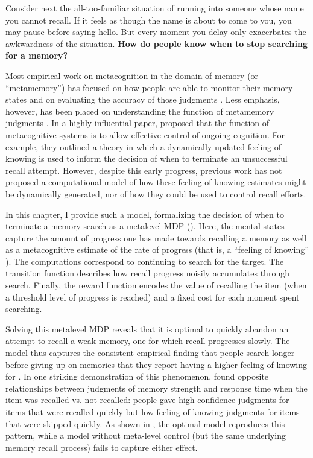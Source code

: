 \documentclass[dsingle]{memo}
\begin{document}
Consider next the all-too-familiar situation of running into someone whose name you cannot recall. If it feels as though the name is about to come to you, you may pause before saying hello. But every moment you delay only exacerbates the awkwardness of the situation. \textbf{How do people know when to stop searching for a memory?}

Most empirical work on metacognition in the domain of memory (or ``metamemory'') has focused on how people are able to monitor their memory states \citep{reder1992determines,eakin2005illusions} and on evaluating the accuracy of those judgments \citep{hart1965memory,vesonder1985ability,dunlosky2007metacomprehension}. Less emphasis, however, has been placed on understanding the function of metamemory judgments \citep{schwartz2017metamemory}. In a highly influential paper, \citet{nelson1990metamemory} proposed that the function of metacognitive systems is to allow effective control of ongoing cognition. For example, they outlined a theory in which a dynamically updated feeling of knowing is used to inform the decision of when to terminate an unsuccessful recall attempt. However, despite this early progress, previous work has not proposed a computational model of how these feeling of knowing estimates might be dynamically generated, nor of how they could be used to control recall efforts. 

In this chapter, I provide such a model, formalizing the decision of when to terminate a memory search as a metalevel MDP (). Here, the mental states capture the amount of progress one has made towards recalling a memory as well as a metacognitive estimate of the rate of progress (that is, a ``feeling of knowing'' \citealp{hart1965memory}). The computations correspond to continuing to search for the target. The transition function describes how recall progress noisily accumulates through search. Finally, the reward function encodes the value of recalling the item (when a threshold level of progress is reached) and a fixed cost for each moment spent searching.

Solving this metalevel MDP reveals that it is optimal to quickly abandon an attempt to recall a weak memory, one for which recall progresses slowly. The model thus captures the consistent empirical finding that people search longer before giving up on memories that they report having a higher feeling of knowing for \citealp{nelson1984comparison,nhouyvanisvong1998rapid,gruneberg1977methodological,lachman1979metamemory}. In one striking demonstration of this phenomenon, \citet{costermans1992confidence} found opposite relationships between judgments of memory strength and response time when the item was recalled vs. not recalled: people gave high confidence judgments for items that were recalled quickly but low feeling-of-knowing judgments for items that were skipped quickly. As shown in , the optimal model reproduces this pattern, while a model without meta-level control (but the same underlying memory recall process) fails to capture either effect.
\end{document}
